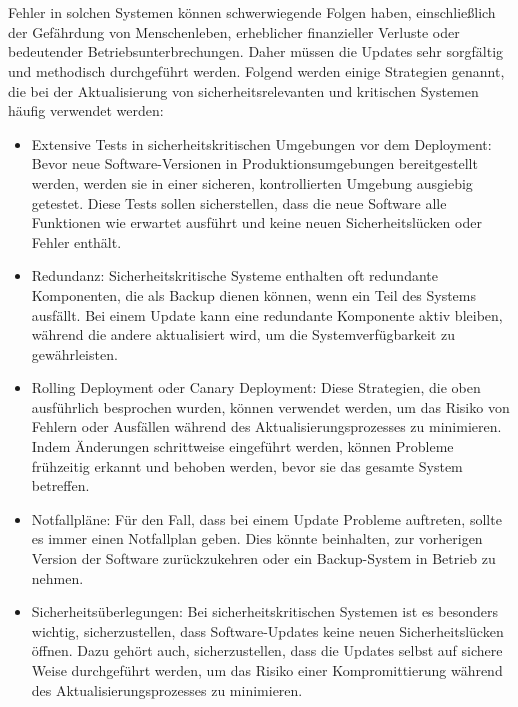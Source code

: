 \\\\
Fehler in solchen Systemen können schwerwiegende Folgen haben, einschließlich der Gefährdung von Menschenleben, erheblicher finanzieller Verluste oder bedeutender Betriebsunterbrechungen. Daher müssen die Updates sehr sorgfältig und methodisch durchgeführt werden.
Folgend werden einige Strategien genannt, die bei der Aktualisierung von sicherheitsrelevanten und kritischen Systemen häufig verwendet werden:
\begin{itemize} 
\item Extensive Tests in sicherheitskritischen Umgebungen vor dem Deployment: Bevor neue Software-Versionen in Produktionsumgebungen bereitgestellt werden, werden sie in einer sicheren, kontrollierten Umgebung ausgiebig getestet. Diese Tests sollen sicherstellen, dass die neue Software alle Funktionen wie erwartet ausführt und keine neuen Sicherheitslücken oder Fehler enthält.

\item Redundanz: Sicherheitskritische Systeme enthalten oft redundante Komponenten, die als Backup dienen können, wenn ein Teil des Systems ausfällt. Bei einem Update kann eine redundante Komponente aktiv bleiben, während die andere aktualisiert wird, um die Systemverfügbarkeit zu gewährleisten.

\item Rolling Deployment oder Canary Deployment: Diese Strategien, die oben ausführlich besprochen wurden, können verwendet werden, um das Risiko von Fehlern oder Ausfällen während des Aktualisierungsprozesses zu minimieren. Indem Änderungen schrittweise eingeführt werden, können Probleme frühzeitig erkannt und behoben werden, bevor sie das gesamte System betreffen.

\item  Notfallpläne: Für den Fall, dass bei einem Update Probleme auftreten, sollte es immer einen Notfallplan geben. Dies könnte beinhalten, zur vorherigen Version der Software zurückzukehren oder ein Backup-System in Betrieb zu nehmen.

\item Sicherheitsüberlegungen: Bei sicherheitskritischen Systemen ist es besonders wichtig, sicherzustellen, dass Software-Updates keine neuen Sicherheitslücken öffnen. Dazu gehört auch, sicherzustellen, dass die Updates selbst auf sichere Weise durchgeführt werden, um das Risiko einer Kompromittierung während des Aktualisierungsprozesses zu minimieren.
\end{itemize} 
